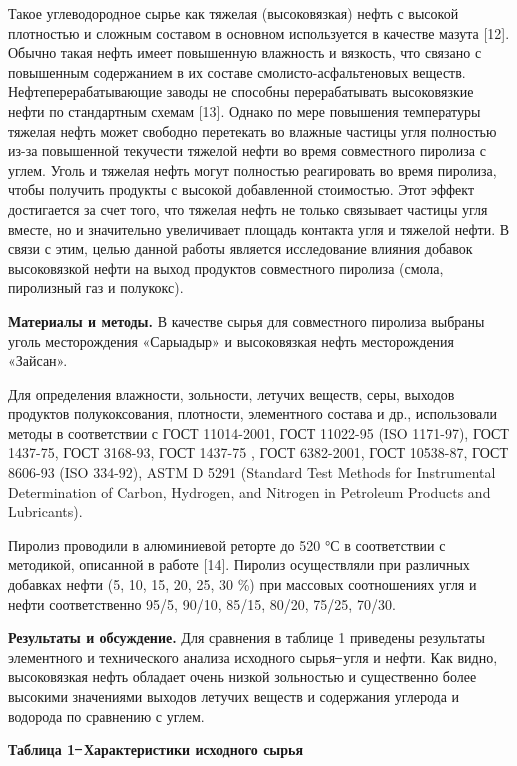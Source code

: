 Такое углеводородное сырье как тяжелая (высоковязкая) нефть с высокой
плотностью и сложным составом в основном используется в качестве мазута
{[}12{]}. Обычно такая нефть имеет повышенную влажность и вязкость, что
связано с повышенным содержанием в их составе смоли­сто-асфальтеновых
веществ. Нефтеперерабатывающие заводы не способны перерабатывать
высоковязкие нефти по стандартным схемам {[}13{]}. Однако по мере
повышения температуры тяжелая нефть может свободно перетекать во влажные
частицы угля полностью из-за повышенной текучести тяжелой нефти во время
совместного пиролиза с углем. Уголь и тяжелая нефть могут полностью
реагировать во время пиролиза, чтобы получить продукты с высокой
добавленной стоимостью. Этот эффект достигается за счет того, что
тяжелая нефть не только связывает частицы угля вместе, но и значительно
увеличивает площадь контакта угля и тяжелой нефти. В связи с этим, целью
данной работы является исследование влияния добавок высоковязкой нефти
на выход продуктов совместного пиролиза (смола, пиролизный газ и
полукокс).

{\bfseries Материалы и методы.} В качестве сырья для совместного пиролиза
выбраны уголь месторождения «Сарыадыр» и высоковязкая нефть
месторождения «Зайсан».

Для определения влажности, зольности, летучих веществ, серы, выходов
продуктов полукоксования, плотности, элементного состава и др.,
использовали методы в соответствии с ГОСТ 11014-2001, ГОСТ 11022-95 (ISO
1171-97), ГОСТ 1437-75, ГОСТ 3168-93, ГОСТ 1437-75 , ГОСТ 6382-2001,
ГОСТ 10538-87, ГОСТ 8606-93 (ISO 334-92), ASTM D 5291 (Standard Test
Methods for Instrumental Determination of Carbon, Hydrogen, and Nitrogen
in Petroleum Products and Lubricants).

Пиролиз проводили в алюминиевой реторте до 520 °С в соответствии с
методикой, описанной в работе {[}14{]}. Пиролиз осуществляли при
различных добавках нефти (5, 10, 15, 20, 25, 30 \%) при массовых
соотношениях угля и нефти соответственно 95/5, 90/10, 85/15, 80/20,
75/25, 70/30.

{\bfseries Результаты и обсуждение.} Для сравнения в таблице 1 приведены
результаты элементного и технического анализа исходного сырья ̶ угля и
нефти. Как видно, высоковязкая нефть обладает очень низкой зольностью и
существенно более высокими значениями выходов летучих веществ и
содержания углерода и водорода по сравнению с углем.

{\bfseries Таблица 1 ̶ Характеристики исходного сырья}

